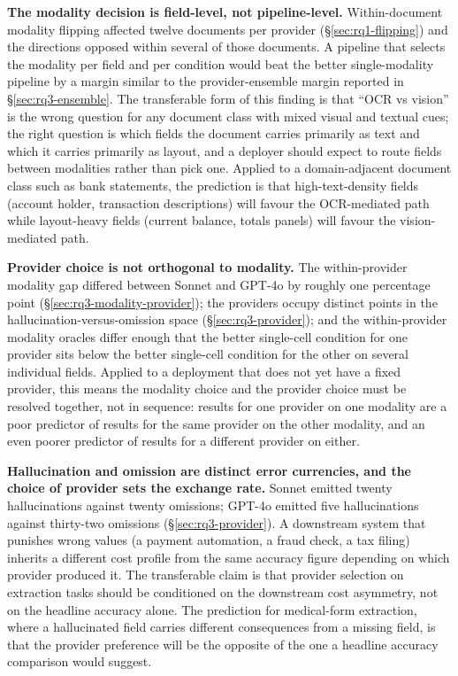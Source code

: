 \textbf{The modality decision is field-level, not pipeline-level.}
Within-document modality flipping affected twelve documents per provider
(\S\ref{sec:rq1-flipping}) and the directions opposed within several of those
documents. A pipeline that selects the modality per field and per condition
would beat the better single-modality pipeline by a margin similar to the
provider-ensemble margin reported in \S\ref{sec:rq3-ensemble}. The
transferable form of this finding is that ``OCR vs vision'' is the wrong
question for any document class with mixed visual and textual cues; the right
question is which fields the document carries primarily as text and which it
carries primarily as layout, and a deployer should expect to route fields
between modalities rather than pick one. Applied to a domain-adjacent
document class such as bank statements, the prediction is that
high-text-density fields (account holder, transaction descriptions) will favour
the OCR-mediated path while layout-heavy fields (current balance, totals
panels) will favour the vision-mediated path.

\textbf{Provider choice is not orthogonal to modality.} The within-provider
modality gap differed between Sonnet and GPT-4o by roughly one percentage point
(\S\ref{sec:rq3-modality-provider}); the providers occupy distinct points in
the hallucination-versus-omission space (\S\ref{sec:rq3-provider}); and the
within-provider modality oracles differ enough that the better single-cell
condition for one provider sits below the better single-cell condition for the
other on several individual fields. Applied to a deployment that does not yet
have a fixed provider, this means the modality choice and the provider choice
must be resolved together, not in sequence: results for one provider on one
modality are a poor predictor of results for the same provider on the other
modality, and an even poorer predictor of results for a different provider on
either.

\textbf{Hallucination and omission are distinct error currencies, and the
choice of provider sets the exchange rate.} Sonnet emitted twenty
hallucinations against twenty omissions; GPT-4o emitted five hallucinations
against thirty-two omissions (\S\ref{sec:rq3-provider}). A downstream system
that punishes wrong values (a payment automation, a fraud check, a tax
filing) inherits a different cost profile from the same accuracy figure
depending on which provider produced it. The transferable claim is that
provider selection on extraction tasks should be conditioned on the
downstream cost asymmetry, not on the headline accuracy alone. The
prediction for medical-form extraction, where a hallucinated field carries
different consequences from a missing field, is that the provider preference
will be the opposite of the one a headline accuracy comparison would suggest.

